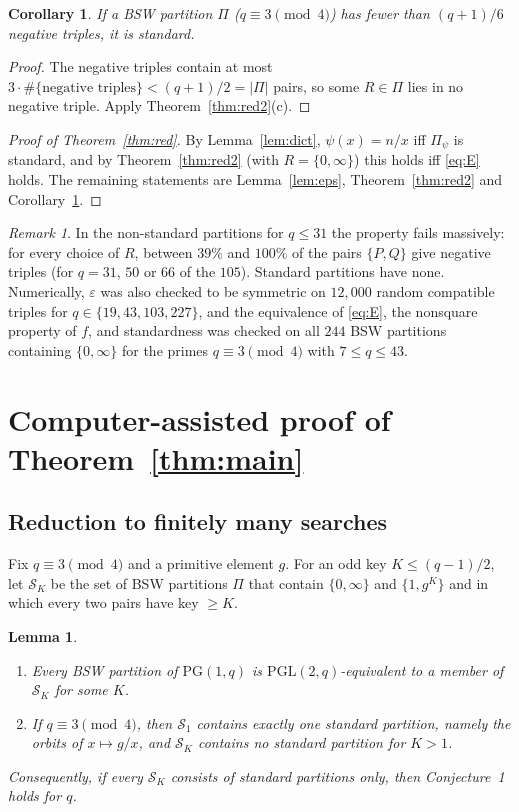 \documentclass[11pt,a4paper]{article}
\newtheorem{lemma}[theorem]{Lemma}
\newtheorem{corollary}[theorem]{Corollary}
\theoremstyle{definition}
\theoremstyle{remark}
\newtheorem{remark}[theorem]{Remark}
\newcommand{\PG}{\mathrm{PG}}
\newcommand{\PGL}{\mathrm{PGL}}
\begin{document}
\begin{corollary}\label{cor:few}
If a BSW partition $\Pi$ ($q\equiv3\pmod4$) has fewer than $(q+1)/6$ negative triples, it is standard.
\end{corollary}

\begin{proof}
The negative triples contain at most $3\cdot\#\{\text{negative triples}\}<(q+1)/2=|\Pi|$ pairs, so some $R\in\Pi$ lies
in no negative triple. Apply Theorem~\ref{thm:red2}(c).
\end{proof}

\begin{proof}[Proof of Theorem~\ref{thm:red}]
By Lemma~\ref{lem:dict}, $\psi(x)=n/x$ iff $\Pi_\psi$ is standard, and by Theorem~\ref{thm:red2} (with
$R=\{0,\infty\}$) this holds iff \eqref{eq:E} holds. The remaining statements are Lemma~\ref{lem:eps},
Theorem~\ref{thm:red2} and Corollary~\ref{cor:few}.
\end{proof}

\begin{remark}
In the non-standard partitions for $q\le31$ the property fails massively: for every choice of $R$, between
$39\%$ and $100\%$ of the pairs $\{P,Q\}$ give negative triples (for $q=31$, $50$ or $66$ of the $105$). Standard
partitions have none. Numerically, $\varepsilon$ was also checked to be symmetric on $12{,}000$ random compatible
triples for $q\in\{19,43,103,227\}$, and the equivalence of \eqref{eq:E}, the nonsquare property of $f$, and
standardness was checked on all $244$ BSW partitions containing $\{0,\infty\}$ for the primes $q\equiv3\pmod4$
with $7\le q\le43$.
\end{remark}

\section{Computer-assisted proof of Theorem~\ref{thm:main}}

\subsection{Reduction to finitely many searches}

Fix $q\equiv3\pmod4$ and a primitive element $g$. For an odd key $K\le(q-1)/2$, let $\mathcal S_K$ be the set of
BSW partitions $\Pi$ that contain $\{0,\infty\}$ and $\{1,g^K\}$ and in which every two pairs have key
$\ge K$.

\begin{lemma}\label{lem:orderly}
\begin{enumerate}
\item[(i)] Every BSW partition of $\PG(1,q)$ is $\PGL(2,q)$-equivalent to a member of $\mathcal S_K$ for some
$K$.
\item[(ii)] If $q\equiv3\pmod 4$, then $\mathcal S_1$ contains exactly one standard partition, namely the orbits
of $x\mapsto g/x$, and $\mathcal S_K$ contains no standard partition for $K>1$.
\end{enumerate}
Consequently, if every $\mathcal S_K$ consists of standard partitions only, then Conjecture~1 holds for $q$.
\end{lemma}
\end{document}
